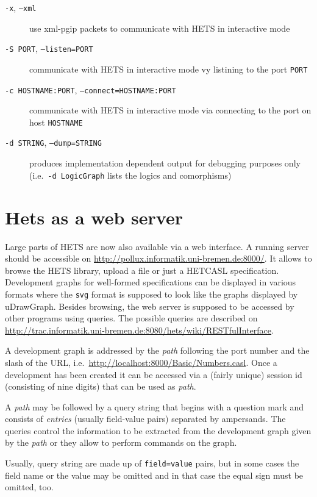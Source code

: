 \documentclass{article}
\newcommand{\normalTEXTSC}[2]{{#1\scriptsize#2}}
\newcommand     {\Hets}{\normalTEXTSC{H}{ETS}\xspace}
\newcommand{\HetCASL}{\normalTEXTSC{H}{ET}\normalTEXTSC{C}{ASL}\xspace}
\begin{document}
\begin{description}
\item[\texttt{-x}, \texttt{--xml}] use xml-pgip packets to communicate with
  \Hets in interactive mode

\item[\texttt{-S PORT}, \texttt{--listen=PORT}] communicate
  with \Hets in interactive mode vy listining to the port \texttt{PORT}

\item[\texttt{-c HOSTNAME:PORT}, \texttt{--connect=HOSTNAME:PORT}] communicate
  with \Hets in interactive mode via connecting to the port on host
  \texttt{HOSTNAME}

\item[\texttt{-d STRING}, \texttt{--dump=STRING}] produces implementation
  dependent output for debugging purposes only
  (i.e.\ \texttt{-d LogicGraph} lists the logics and comorphisms)
\end{description}

\section{Hets as a web server}\label{sec:Server}

Large parts of \Hets are now also available via a web interface. A running
server should be accessible on
\url{http://pollux.informatik.uni-bremen.de:8000/}. It allows to browse the
\Hets library, upload a file or just a \HetCASL specification. Development
graphs for well-formed specifications can be displayed in various formats
where the \texttt{svg} format is supposed to look like the graphs displayed by
uDrawGraph. Besides browsing, the web server is supposed to be accessed by
other programs using queries. The possible queries are described on
\url{http://trac.informatik.uni-bremen.de:8080/hets/wiki/RESTfulInterface}.

A development graph is addressed by the \emph{path} following the port number
and the slash of the URL, i.e.\
\url{http://localhost:8000/Basic/Numbers.casl}. Once a development has been
created it can be accessed via a (fairly unique) session id (consisting of
nine digits) that can be used as \emph{path}.

A \emph{path} may be followed by a query string that begins with a question
mark and consists of \emph{entries} (usually field-value pairs) separated by
ampersands. The queries control the information to be extracted from the
development graph given by the \emph{path} or they allow to perform commands
on the graph.

Usually, query string are made up of \texttt{field=value} pairs, but in some
cases the field name or the value may be omitted and in that case the equal
sign must be omitted, too.
\end{document}
